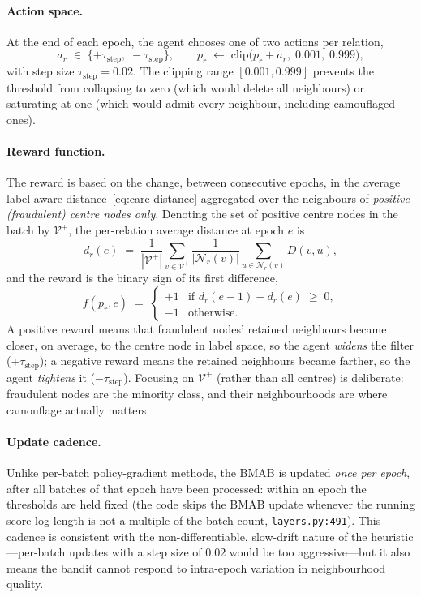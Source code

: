 \paragraph{Action space.} At the end of each epoch, the agent chooses one of two actions per relation,
\begin{equation}
a_r \;\in\; \{+\tau_{\text{step}},\; -\tau_{\text{step}}\},
\qquad
p_r \;\leftarrow\; \mathrm{clip}\bigl(p_r + a_r,\; 0.001,\; 0.999\bigr),
\end{equation}
with step size $\tau_{\text{step}} = 0.02$. The clipping range $[0.001, 0.999]$ prevents the threshold from collapsing to zero (which would delete all neighbours) or saturating at one (which would admit every neighbour, including camouflaged ones).

\paragraph{Reward function.} The reward is based on the change, between consecutive epochs, in the average label-aware distance~\eqref{eq:care-distance} aggregated over the neighbours of \emph{positive (fraudulent) centre nodes only}. Denoting the set of positive centre nodes in the batch by $\mathcal{V}^{+}$, the per-relation average distance at epoch $e$ is
\begin{equation}
d_r(e) \;=\; \frac{1}{|\mathcal{V}^{+}|} \sum_{v \in \mathcal{V}^{+}} \frac{1}{|\mathcal{N}_r(v)|} \sum_{u \in \mathcal{N}_r(v)} D(v, u),
\label{eq:bandit-distance}
\end{equation}
and the reward is the binary sign of its first difference,
\begin{equation}
f(p_r, e) \;=\;
\begin{cases}
+1 & \text{if } d_r(e-1) - d_r(e) \;\geq\; 0, \\
-1 & \text{otherwise.}
\end{cases}
\label{eq:bandit-reward}
\end{equation}
A positive reward means that fraudulent nodes' retained neighbours became closer, on average, to the centre node in label space, so the agent \emph{widens} the filter ($+\tau_{\text{step}}$); a negative reward means the retained neighbours became farther, so the agent \emph{tightens} it ($-\tau_{\text{step}}$). Focusing on $\mathcal{V}^{+}$ (rather than all centres) is deliberate: fraudulent nodes are the minority class, and their neighbourhoods are where camouflage actually matters.

\paragraph{Update cadence.} Unlike per-batch policy-gradient methods, the BMAB is updated \emph{once per epoch}, after all batches of that epoch have been processed: within an epoch the thresholds are held fixed (the code skips the BMAB update whenever the running score log length is not a multiple of the batch count, \texttt{layers.py:491}). This cadence is consistent with the non-differentiable, slow-drift nature of the heuristic---per-batch updates with a step size of $0.02$ would be too aggressive---but it also means the bandit cannot respond to intra-epoch variation in neighbourhood quality.


